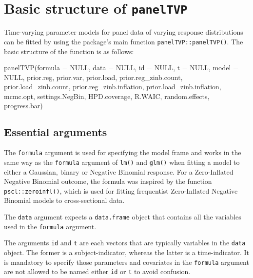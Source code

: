 \documentclass[a4paper, preprint, 3p,
authoryear]{elsarticle} %
\newenvironment{Shaded}{\begin{snugshade}}{\end{snugshade}}
\newcommand{\NormalTok}[1]{#1}
\begin{document}
\section{\texorpdfstring{Basic structure of
\texttt{panelTVP}}{Basic structure of }}\label{basic-structure-of}

Time-varying parameter models for panel data of varying response
distributions can be fitted by using the package's main function
\texttt{panelTVP::panelTVP()}. The basic structure of the function is as
follows:

\begin{Shaded}
\begin{Highlighting}[]
\NormalTok{panelTVP(formula = NULL,}
\NormalTok{         data = NULL,}
\NormalTok{         id = NULL,}
\NormalTok{         t = NULL,}
\NormalTok{         model = NULL,}
\NormalTok{         prior.reg,}
\NormalTok{         prior.var,}
\NormalTok{         prior.load,}
\NormalTok{         prior.reg\_zinb.count,}
\NormalTok{         prior.load\_zinb.count,}
\NormalTok{         prior.reg\_zinb.inflation,}
\NormalTok{         prior.load\_zinb.inflation,}
\NormalTok{         mcmc.opt,}
\NormalTok{         settings.NegBin,}
\NormalTok{         HPD.coverage,}
\NormalTok{         R.WAIC,}
\NormalTok{         random.effects,}
\NormalTok{         progress.bar)}
\end{Highlighting}
\end{Shaded}

\subsection{Essential arguments}\label{essential-arguments}

The \texttt{formula} argument is used for specifying the model frame and
works in the same way as the \texttt{formula} argument of \texttt{lm()}
and \texttt{glm()} when fitting a model to either a Gaussian, binary or
Negative Binomial response. For a Zero-Inflated Negative Binomial
outcome, the formula was inspired by the function
\texttt{pscl::zeroinfl()}, which is used for fitting frequentist
Zero-Inflated Negative Binomial models to cross-sectional data.

The \texttt{data} argument expects a \texttt{data.frame} object that
contains all the variables used in the \texttt{formula} argument.

The arguments \texttt{id} and \texttt{t} are each vectors that are
typically variables in the \texttt{data} object. The former is a
subject-indicator, whereas the latter is a time-indicator. It is
mandatory to specify those parameters and covariates in the
\texttt{formula} argument are not allowed to be named either \texttt{id}
or \texttt{t} to avoid confusion.
\end{document}
